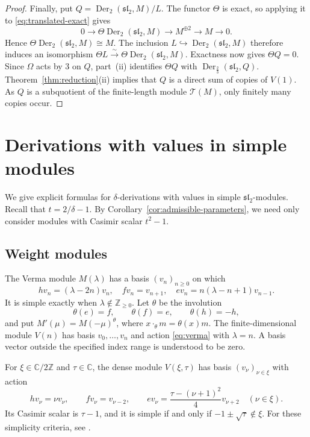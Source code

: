 \documentclass[11pt,reqno]{amsart}
\numberwithin{equation}{section}
\newcommand{\C}{\mathbb C}
\newcommand{\Z}{\mathbb Z}
\newcommand{\s}{\mathfrak{sl}_2}
\newcommand{\T}{\mathcal T}
\DeclareMathOperator{\Der}{Der}
\theoremstyle{definition}
\theoremstyle{remark}
\begin{document}
\begin{proof}
Finally, put \(Q=\Der_2(\s,M)/L\). The functor \(\Theta\) is exact,
so applying it to \eqref{eq:translated-exact} gives
\[
0\longrightarrow\Theta\Der_2(\s,M)
\longrightarrow M^{\oplus2}\longrightarrow M\longrightarrow0.
\]
Hence \(\Theta\Der_2(\s,M)\cong M\). The inclusion
\(L\hookrightarrow\Der_2(\s,M)\) therefore induces an isomorphism
\(\Theta L\xrightarrow{\sim}\Theta\Der_2(\s,M)\).
Exactness now gives \(\Theta Q=0\).
Since \(\Omega\) acts by \(3\) on \(Q\), part~\textup{(ii)} identifies
\(\Theta Q\) with \(\Der_{\frac{2}{3}}(\s,Q)\).
Theorem~\ref{thm:reduction}\textup{(ii)} implies that \(Q\) is a direct
sum of copies of \(V(1)\). As \(Q\) is a subquotient of the
finite-length module \(\T(M)\), only finitely many copies occur.
\end{proof}

\section{Derivations with values in simple modules}\label{sec:explicit}

We give explicit formulas for \(\delta\)-derivations with values
in simple \(\s\)-modules. Recall that \(t=2/\delta-1\).
By Corollary~\ref{cor:admissible-parameters}, we need only consider
modules with Casimir scalar \(t^2-1\).

\subsection{Weight modules}\label{subsec:weight}

The Verma module \(M(\lambda)\) has a basis \((v_n)_{n\ge0}\) on which
\begin{equation}\label{eq:verma}
hv_n=(\lambda-2n)v_n,\quad fv_n=v_{n+1},\quad
ev_n=n(\lambda-n+1)v_{n-1}.
\end{equation}
It is simple exactly when \(\lambda\notin\Z_{\ge0}\).
Let \(\theta\) be the involution
\[
\theta(e)=f,\qquad \theta(f)=e,\qquad \theta(h)=-h,
\]
and put \(M'(\mu)=M(-\mu)^\theta\), where
\(x\cdot_\theta m=\theta(x)m\). The finite-dimensional module \(V(n)\) has basis
\(v_0,\ldots,v_n\) and action \eqref{eq:verma} with \(\lambda=n\).
A basis vector outside the specified index range is understood to be zero.

For \(\xi\in\C/2\Z\) and \(\tau\in\C\), the dense module \(V(\xi,\tau)\)
has basis \((v_\nu)_{\nu\in\xi}\) with action
\begin{equation}\label{eq:dense}
hv_\nu=\nu v_\nu,\qquad fv_\nu=v_{\nu-2},\qquad
ev_\nu=\frac{\tau-(\nu+1)^2}{4}v_{\nu+2}
\quad(\nu\in\xi).
\end{equation}
Its Casimir scalar is \(\tau-1\), and it is simple if and only if
\(-1\pm\sqrt\tau\notin\xi\). For these simplicity criteria,
see \cite{Maz10}.
\end{document}
